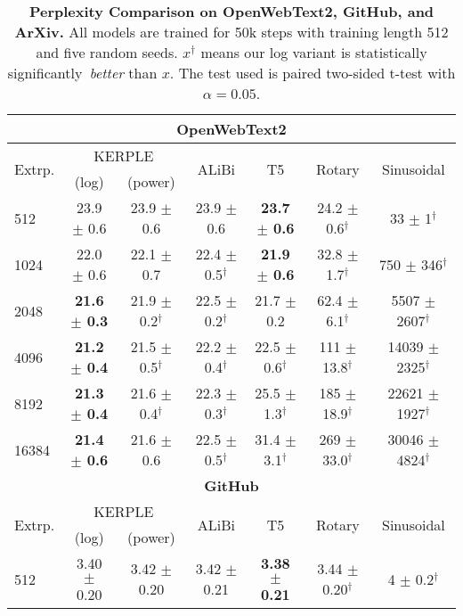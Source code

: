 \begin{table}[!ht]
    \setlength{\tabcolsep}{2pt}
    \centering
    \caption{\textbf{Perplexity Comparison on OpenWebText2, GitHub, and ArXiv.} All models are trained for 50k steps with training length 512 and five random seeds. $x^\dagger$ means our log variant is statistically significantly~\emph{better} than $x$. The test used is paired two-sided t-test with $\alpha=0.05$.}
    \begin{tabular}{@{\extracolsep{3pt}}lcccccc}
    \hline\hline
    \multicolumn{7}{c}{\textbf{OpenWebText2}}\\
    \hline
    \multirow{2}{*}{Extrp.} & \multicolumn{2}{c}{KERPLE} &
     \multirow{2}{*}{ALiBi} & \multirow{2}{*}{T5} & \multirow{2}{*}{Rotary} & \multirow{2}{*}{Sinusoidal}\\
     \cline{2-3}
     &   (log) & (power) &  &  &  & \\ \hline
    512 & 23.9 $\pm$ 0.6 & 23.9 $\pm$ 0.6 & 23.9 $\pm$ 0.6 & \textbf{23.7 $\pmb{\pm}$ 0.6} & 24.2 $\pm$ 0.6$^\dagger$ & 33 $\pm$ 1$^\dagger$\\
1024 & 22.0 $\pm$ 0.6 & 22.1 $\pm$ 0.7 & 22.4 $\pm$ 0.5$^\dagger$ & \textbf{21.9 $\pmb{\pm}$ 0.6} & 32.8 $\pm$ 1.7$^\dagger$ & 750 $\pm$ 346$^\dagger$\\
2048 & \textbf{21.6 $\pmb{\pm}$ 0.3} & 21.9 $\pm$ 0.2$^\dagger$ & 22.5 $\pm$ 0.2$^\dagger$ & 21.7 $\pm$ 0.2 & 62.4 $\pm$ 6.1$^\dagger$ & 5507 $\pm$ 2607$^\dagger$\\
4096 & \textbf{21.2 $\pmb{\pm}$ 0.4} & 21.5 $\pm$ 0.5$^\dagger$ & 22.2 $\pm$ 0.4$^\dagger$ & 22.5 $\pm$ 0.6$^\dagger$ & 111 $\pm$ 13.8$^\dagger$ & 14039 $\pm$ 2325$^\dagger$\\
8192 & \textbf{21.3 $\pmb{\pm}$ 0.4} & 21.6 $\pm$ 0.4$^\dagger$ & 22.3 $\pm$ 0.3$^\dagger$ & 25.5 $\pm$ 1.3$^\dagger$ & 185 $\pm$ 18.9$^\dagger$ & 22621 $\pm$ 1927$^\dagger$\\
16384 & \textbf{21.4 $\pmb{\pm}$ 0.6} & 21.6 $\pm$ 0.6 & 22.5 $\pm$ 0.5$^\dagger$ & 31.4 $\pm$ 3.1$^\dagger$ & 269 $\pm$ 33.0$^\dagger$ & 30046 $\pm$ 4824$^\dagger$\\
    \hline\hline
    \multicolumn{7}{c}{\textbf{GitHub}}\\
    \hline
    \multirow{2}{*}{Extrp.}& \multicolumn{2}{c}{KERPLE} & \multirow{2}{*}{ALiBi} & \multirow{2}{*}{T5} & \multirow{2}{*}{Rotary} & \multirow{2}{*}{Sinusoidal} \\
     \cline{2-3}
     &   (log) & (power) &  &  &  & \\ \hline
    512 & 3.40 $\pm$ 0.20 & 3.42 $\pm$ 0.20 & 3.42 $\pm$ 0.21 & \textbf{3.38 $\pmb{\pm}$ 0.21} & 3.44 $\pm$ 0.20$^\dagger$ & 4 $\pm$ 0.2$^\dagger$\\

\end{tabular}
\end{table}
